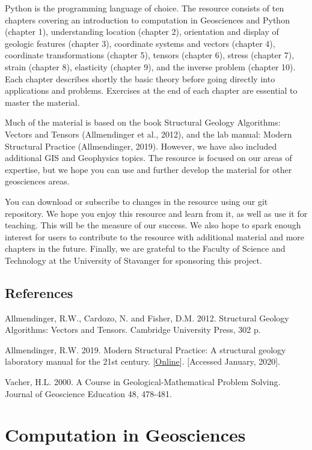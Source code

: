 \documentclass[a4paper , 12pt]{book}
\begin{document}
Python is the programming language of choice. The resource consists of ten chapters covering an introduction to computation in Geosciences and Python (chapter 1), understanding location (chapter 2), orientation and display of geologic features (chapter 3), coordinate systems and vectors (chapter 4), coordinate transformations (chapter 5), tensors (chapter 6), stress (chapter 7), strain (chapter 8), elasticity (chapter 9), and the inverse problem (chapter 10). Each chapter describes shortly the basic theory before going directly into applications and problems. Exercises at the end of each chapter are essential to master the material. 

Much of the material is based on the book Structural Geology Algorithms: Vectors and Tensors (Allmendinger et al., 2012), and the lab manual: Modern Structural Practice (Allmendinger, 2019). However, we have also included additional GIS and Geophysics topics. The resource is focused on our areas of expertise, but we hope you can use and further develop the material for other geosciences areas.

You can download or subscribe to changes in the resource using our git repository. We hope you enjoy this resource and learn from it, as well as use it for teaching. This will be the measure of our success. We also hope to spark enough interest for users to contribute to the resource with additional material and more chapters in the future. Finally, we are grateful to the Faculty of Science and Technology at the University of Stavanger for sponsoring this project.

\section*{References}
Allmendinger, R.W., Cardozo, N. and Fisher, D.M. 2012. Structural Geology Algorithms: Vectors and Tensors. Cambridge University Press, 302 p.

Allmendinger, R.W. 2019. Modern Structural Practice: A structural geology laboratory manual for the 21st century. [\href{http://www.geo.cornell.edu/geology/faculty/RWA/structure-lab-manual}{Online}]. [Accessed January, 2020].

Vacher, H.L. 2000. A Course in Geological-Mathematical Problem Solving. Journal of Geoscience Education 48, 478-481.

\tableofcontents

\chapter{Computation in Geosciences}
\end{document}
